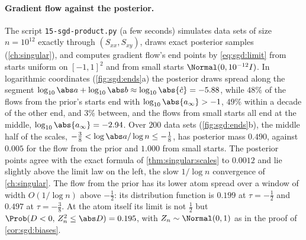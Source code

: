\begin{refsection}
\paragraph{Gradient flow against the posterior.} The script \texttt{15-sgd-product.py} (a few seconds) simulates data sets of size $n=10^{12}$ exactly through $(S_{xx},S_{xy})$, draws exact posterior samples (\cref{ch:singular}), and computes gradient flow's end points by \eqref{eq:sgd:limit} from starts uniform on $[-1,1]^2$ and from small starts $\Normal(0,10^{-12}I)$. In logarithmic coordinates (\cref{fig:sgd:ends}a) the posterior draws spread along the segment $\log_{10}\abs a+\log_{10}\abs b\approx\log_{10}\abs{\hat c}=-5.88$, while $48\%$ of the flows from the prior's starts end with $\log_{10}\abs{a_\infty}>-1$, $49\%$ within a decade of the other end, and $3\%$ between, and the flows from small starts all end at the middle, $\log_{10}\abs{a_\infty}=-2.94$. Over $200$ data sets (\cref{fig:sgd:ends}b), the middle half of the scales, $-\frac38<\log\abs a/\log n\le-\frac18$, has posterior mass $0.490$, against $0.005$ for the flow from the prior and $1.000$ from small starts. The posterior points agree with the exact formula of \cref{thm:singular:scales} to $0.0012$ and lie slightly above the limit law on the left, the slow $1/\log n$ convergence of \cref{ch:singular}. The flow from the prior has its lower atom spread over a window of width $O(1/\log n)$ above $-\frac12$: its distribution function is $0.199$ at $\tau=-\frac12$ and $0.497$ at $\tau=-\frac38$. At the atom itself its limit is not $\frac12$ but $\Prob(D<0,\,Z_n^2\le\abs D)=0.195$, with $Z_n\sim\Normal(0,1)$ as in the proof of \cref{cor:sgd:biases}.


\end{refsection}

